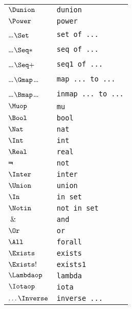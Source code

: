 \documentclass[\pformat,12pt]{article}
\begin{document}
\begin{longtable}{|l|l|}
 $\Dunion$          & {\tt dunion}                      \\
 $\Power$          & {\tt power}                        \\
 \ldots$\Set$            & {\tt set of ...}                    \\
 \ldots$\Seq*$              & {\tt seq of ...}                 \\
 \ldots$\Seq+$              & {\tt seq1 of ...}                 \\
 \ldots$\Gmap$\ldots           & {\tt map ... to ...}                 \\
 \ldots$\Bmap$\ldots           & {\tt inmap ... to ...}                 \\
 $\Muop$           & {\tt mu}                           \\
 $\Bool$           & {\tt bool}                         \\
 $\Nat$            & {\tt nat}                          \\
 $\Int$            & {\tt int}                          \\
 $\Real$           & {\tt real}                         \\
 $\Not$            & {\tt not}                          \\
 $\Inter$          & {\tt inter}                        \\
 $\Union$          & {\tt union}                        \\
 $\In$             & {\tt in set}                       \\
 $\Notin$          & {\tt not in set}                   \\
 $\And$            & {\tt and}                          \\
 $\Or$             & {\tt or}                           \\
 $\All$            & {\tt forall}                       \\
 $\Exists$         & {\tt exists}                       \\
 $\Exists!$        & {\tt exists1}                      \\
 $\Lambdaop$       & {\tt lambda} \\
 $\Iotaop$         & {\tt iota} \\
 $\ldots\Inverse$  & {\tt inverse ...} \\
\hline
\end{longtable}
\end{document}
